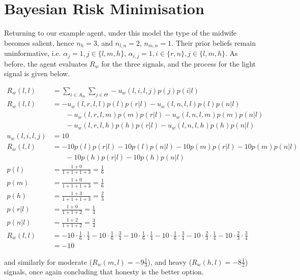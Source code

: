 \section{Bayesian Risk Minimisation}
\label{sub:bayes_eg}

Returning to our example agent, under this model the type of the midwife becomes salient, hence \(n_{h}=3\), and \(n_{l,n}=2\), \(n_{m,n}=1\). Their prior beliefs remain uninformative, i.e. \(\alpha_{j} = 1, j \in \{l,m,h\}\), \(\alpha_{i,j}=1,i \in \{r,n\}, j \in \{l,m,h\}\). As before, the agent evaluates \(R_{w}\) for the three signals, and the process for the light signal is given below.

\begin{equation*}
\begin{aligned}
R_{w}(l, l) &= \sum_{i\in A_{m}}\sum_{j\in \Theta} -u_{w}(l, i, l, j)p(j)p(i | l)\\
R_{w}(l, l) &= -u_{w}(l, r, l, l)p(l)p(r | l) - u_{w}(l, n, l, l)p(l)p(n | l)\\
&\phantom{{}=1}- u_{w}(l, r, l, m)p(m)p(r | l)- u_{w}(l, n, l, m)p(m)p(n | l)\\
&\phantom{{}=1}- u_{w}(l, r, l, h)p(h)p(r | l) - u_{w}(l, n, l, h)p(h)p(n | l)\\
u_{w}(l, i, l, j) &= 10\\
R_{w}(l, l) &= -10p(l)p(r | l) - 10p(l)p(n | l) - 10p(m)p(r | l) - 10p(m)p(n | l)\\
&\phantom{{}=1} - 10p(h)p(r | l) - 10p(h)p(n | l)\\
p(l) &= \frac{1 + 0}{1 + 1 + 1 + 3} = \frac{1}{6}\\
p(m) &= \frac{1 + 0}{1 + 1 + 1 + 3} = \frac{1}{6}\\
p(h) &= \frac{1 + 3}{1 + 1 + 1 + 3} = \frac{2}{3}\\
p(r | l) &= \frac{1 + 0}{1 + 1 + 2} = \frac{1}{4}\\
p(n | l) &= \frac{1 + 2}{1 + 1 + 2} = \frac{3}{4}\\
R_{w}(l, l) &= -10\cdot \frac{1}{6} \cdot \frac{1}{4} - 10\cdot \frac{1}{6} \cdot \frac{3}{4} - 10\cdot \frac{1}{6} \cdot \frac{1}{4} - 10\cdot \frac{1}{6} \cdot \frac{3}{4} - 10\cdot \frac{2}{3} \cdot \frac{1}{4} - 10\cdot \frac{2}{3} \cdot \frac{3}{4}\\
&= -10
\end{aligned}
\end{equation*}

and similarly for moderate (\(R_{w}(m,l)=-9\frac{1}{3}\)), and heavy (\(R_{w}(h,l)=-8\frac{1}{2}\)) signals, once again concluding that honesty is the better option.

